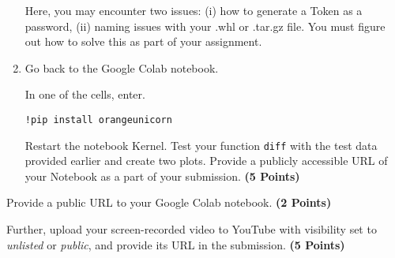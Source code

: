 \documentclass[12pt, xcolor=dvipsnames,svgnames,x11names]{article}
\begin{document}
\begin{enumerate}
Here, you may encounter two issues: (i) how to generate a Token as a password, (ii) naming issues with your .whl or .tar.gz file. You must figure out how to solve this as part of your assignment.

\item Go back to the Google Colab notebook.

In one of the cells, enter.

\begin{verbatim}
!pip install orangeunicorn
\end{verbatim}

Restart the notebook Kernel. Test your function \texttt{diff} with the test data provided earlier and create two plots. Provide a publicly accessible URL of your Notebook as a part of your submission. \hfill \textbf{(5 Points)}

\end{enumerate}

Provide a public URL to your Google Colab notebook. \hfill \textbf{(2 Points)}

Further, upload your screen-recorded video to YouTube with visibility set to \textit{unlisted} or \textit{public}, and provide its URL in the submission.  \hfill \textbf{(5 Points)}
\end{document}
